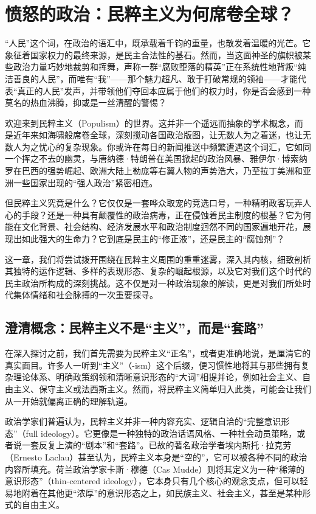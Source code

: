 \documentclass[UTF8, 10pt]{ctexbook}
\begin{document}
\chapter{愤怒的政治：民粹主义为何席卷全球？}

\lettrine[lines=3]{“}{人民}”这个词，在政治的语汇中，既承载着千钧的重量，也散发着温暖的光芒。它象征着国家权力的最终来源，是民主合法性的基石。然而，当这面神圣的旗帜被某些政治力量巧妙地裁剪和挥舞，声称一群“腐败堕落的精英”正在系统性地背叛“纯洁善良的人民”，而唯有“我”——那个魅力超凡、敢于打破常规的领袖——才能代表“真正的人民”发声，并带领他们夺回本应属于他们的权力时，你是否会感到一种莫名的热血沸腾，抑或是一丝清醒的警惕？

欢迎来到民粹主义（Populism）的世界。这并非一个遥远而抽象的学术概念，而是近年来如海啸般席卷全球，深刻搅动各国政治版图，让无数人为之着迷，也让无数人为之忧心的复杂现象。你或许在每日的新闻推送中频繁遭遇这个词汇，它如同一个挥之不去的幽灵，与唐纳德·特朗普在美国掀起的政治风暴、雅伊尔·博索纳罗在巴西的强势崛起、欧洲大陆上勒庞等右翼人物的声势浩大，乃至拉丁美洲和亚洲一些国家出现的“强人政治”紧密相连。

但民粹主义究竟是什么？它仅仅是一套哗众取宠的竞选口号，一种精明政客玩弄人心的手段？还是一种具有颠覆性的政治病毒，正在侵蚀着民主制度的根基？它为何能在文化背景、社会结构、经济发展水平和政治制度迥然不同的国家遍地开花，展现出如此强大的生命力？它到底是民主的“修正液”，还是民主的“腐蚀剂”？

这一章，我们将尝试拨开围绕在民粹主义周围的重重迷雾，深入其内核，细致剖析其独特的运作逻辑、多样的表现形态、复杂的崛起根源，以及它对我们这个时代的民主政治所构成的深刻挑战。这不仅是对一种政治现象的解读，更是对我们所处时代集体情绪和社会脉搏的一次重要探寻。

\section{澄清概念：民粹主义不是“主义”，而是“套路”}
\lettrine[lines=2]{在}{深入}探讨之前，我们首先需要为民粹主义“正名”，或者更准确地说，是厘清它的真实面目。许多人一听到“主义”（-ism）这个后缀，便习惯性地将其与那些拥有复杂理论体系、明确政策纲领和清晰意识形态的“大词”相提并论，例如社会主义、自由主义、保守主义或法西斯主义。然而，将民粹主义简单归入此类，可能会让我们从一开始就偏离正确的理解轨道。

政治学家们普遍认为，民粹主义并非一种内容充实、逻辑自洽的“完整意识形态”（full ideology）。它更像是一种独特的政治话语风格、一种社会动员策略，或者说一套反复上演的“剧本”和“套路”。已故的著名政治学者埃内斯托·拉克劳（Ernesto Laclau）甚至认为，民粹主义本身是“空的”，它可以被各种不同的政治内容所填充。荷兰政治学家卡斯·穆德（Cas Mudde）则将其定义为一种“稀薄的意识形态”（thin-centered ideology），它本身只有几个核心的观念支点，但可以轻易地附着在其他更“浓厚”的意识形态之上，如民族主义、社会主义，甚至是某种形式的自由主义。
\end{document}
